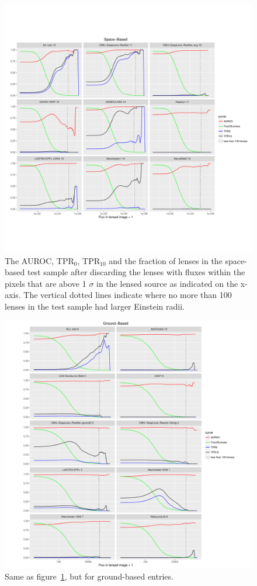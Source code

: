 \documentclass{aa}
\begin{document}
\begin{figure}
 \includegraphics[width=2\columnwidth]{figures/flux_space.pdf}
 \caption{ The AUROC, TPR$_0$, TPR$_{10}$ and the fraction of lenses in the space-based test sample after discarding the lenses with fluxes within the pixels that are above 1 $\sigma$ in the lensed source as indicated on the x-axis. The vertical dotted lines indicate where no more than 100 lenses in the test sample had larger Einstein radii. }
 \label{fig:flux_space}
\end{figure}

\begin{figure}
 \includegraphics[width=2\columnwidth]{figures/flux_ground.pdf}
 \caption{Same as figure~\ref{fig:flux_space}, but for ground-based entries.}
 \label{fig:flux_ground}
\end{figure}
\end{document}
